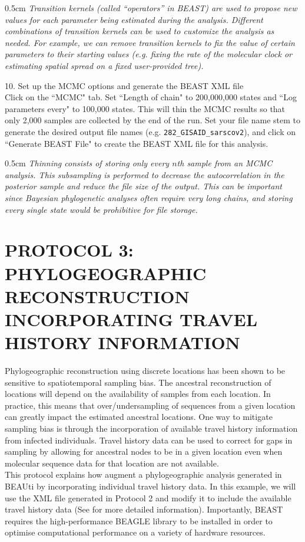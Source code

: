 \documentclass{article}
\newcommand{\ann}[1]{
\begin{adjustwidth}{0.5cm}{}
\it{#1}\\
\end{adjustwidth}}
\begin{document}
\ann{Transition kernels (called ``operators'' in BEAST) are used to propose new values for each parameter being estimated during the analysis.
Different combinations of transition kernels can be used to customize the analysis as needed. For example, we can remove transition kernels to fix the value of certain parameters to
their starting values (e.g. fixing the rate of the molecular clock or estimating spatial spread on a fixed user-provided tree).}

10. Set up the MCMC options and generate the BEAST XML file\\

Click on the ``MCMC" tab. Set ``Length of chain" to 200,000,000 states and ``Log parameters every" to 100,000 states.
This will thin the MCMC results so that only 2,000 samples are collected by the end of the run.
Set your file name stem to generate the desired output file names (e.g. \texttt{282\_GISAID\_sarscov2}), and click on ``Generate BEAST File" to create the BEAST XML file for this analysis.\\

\ann{Thinning consists of storing only every $n$th sample from an MCMC analysis. This subsampling is performed to decrease the autocorrelation in the posterior sample and reduce the file size of the output. This can be important since Bayesian phylogenetic analyses often require very long chains, and storing every single state would be prohibitive for file storage.}


\section*{PROTOCOL 3: PHYLOGEOGRAPHIC RECONSTRUCTION INCORPORATING TRAVEL HISTORY INFORMATION}

Phylogeographic reconstruction using discrete locations has been shown to be sensitive to spatiotemporal sampling bias. The ancestral reconstruction of locations will depend on the availability of samples from each location. In practice, this means that over/undersampling of sequences from a given location can greatly impact the estimated ancestral locations. One way to mitigate sampling bias is through the incorporation of available travel history information from infected individuals. Travel history data can be used to correct for gaps in sampling by allowing for ancestral nodes to be in a given location even when molecular sequence data for that location are not available.\\

This protocol explains how augment a phylogeographic analysis generated in BEAUti by incorporating individual travel history data.
In this example, we will use the XML file generated in Protocol 2 and modify it to include the available travel history data (See \cite{travhist} for more detailed information).
Importantly, BEAST requires the high-performance BEAGLE library \cite{beagle3} to be installed in order to optimise computational performance on a variety of hardware resources.
\end{document}
